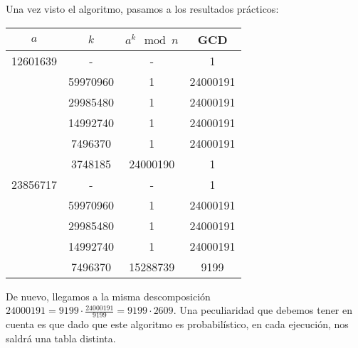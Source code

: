 \begin{enumerate}
		Una vez visto el algoritmo, pasamos a los resultados prácticos:
		\begin{table}[H]
		\centering
		\begin{tabular}{| c | c | c | c |}
		\hline
		$a$         & $k$             & $a^k \mod n$        & GCD       \\ \hline
		12601639    & -               & -                   & 1         \\ \cline{2-4}
		            & 59970960        & 1                   & 24000191  \\ 
		            & 29985480        & 1                   & 24000191  \\ 
		            & 14992740        & 1                   & 24000191  \\ 
		            & 7496370         & 1                   & 24000191  \\ 
		            & 3748185         & 24000190            & 1         \\ \hline
		23856717    & -               & -                   & 1         \\ \cline{2-4}
		            & 59970960        & 1                   & 24000191  \\ 
		            & 29985480        & 1                   & 24000191  \\ 
		            & 14992740        & 1                   & 24000191  \\ 
		            & 7496370         & 15288739            & 9199      \\ \hline
		\end{tabular}
		\end{table}
		
		De nuevo, llegamos a la misma descomposición $\displaystyle 24000191 = 9199 \cdot \frac{24000191}{9199}
		= 9199 \cdot 2609$. Una peculiaridad que debemos tener en cuenta es que dado que este algoritmo es
		probabilístico, en cada ejecución, nos saldrá una tabla distinta.
	\end{enumerate}
